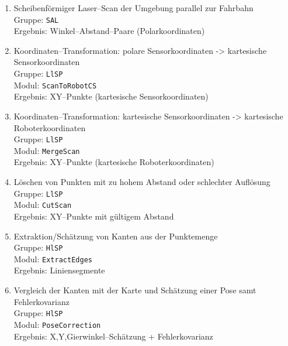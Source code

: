 \begin{enumerate}
  \item Scheibenförmiger Laser--Scan der Umgebung parallel zur Fahrbahn\\
    	Gruppe: \lstinline{SAL}\\
    	Ergebnis: Winkel--Abstand--Paare (Polarkoordinaten)\\
  \item Koordinaten--Transformation: polare Sensorkoordinaten -> kartesische
  		Sensorkoordinaten\\
  		Gruppe: \lstinline{LlSP}\\
    	Modul: \lstinline{ScanToRobotCS}\\
    	Ergebnis: XY--Punkte (kartesische Sensorkoordinaten)\\
  \item Koordinaten--Transformation: kartesische Sensorkoordinaten -> kartesische
  		Roboterkoordinaten\\ 
  		Gruppe: \lstinline{LlSP}\\
  		Modul: \lstinline{MergeScan}\\
  		Ergebnis: XY--Punkte (kartesische Roboterkoordinaten)\\
  \item Löschen von Punkten mit zu hohem Abstand oder schlechter Auflösung\\
    	Gruppe: \lstinline{LlSP}\\
    	Modul: \lstinline{CutScan}\\
    	Ergebnis: XY--Punkte mit gültigem Abstand\\
  \item Extraktion/Schätzung von Kanten aus der Punktemenge\\
    	Gruppe: \lstinline{HlSP}\\
    	Modul: \lstinline{ExtractEdges}\\
    	Ergebnis: Liniensegmente\\
  \item Vergleich der Kanten mit der Karte und Schätzung einer Pose samt
  		Fehlerkovarianz\\ 
  		Gruppe: \lstinline{HlSP}\\
    	Modul: \lstinline{PoseCorrection}\\
    	Ergebnis: X,Y,Gierwinkel--Schätzung + Fehlerkovarianz\\
\end{enumerate}

